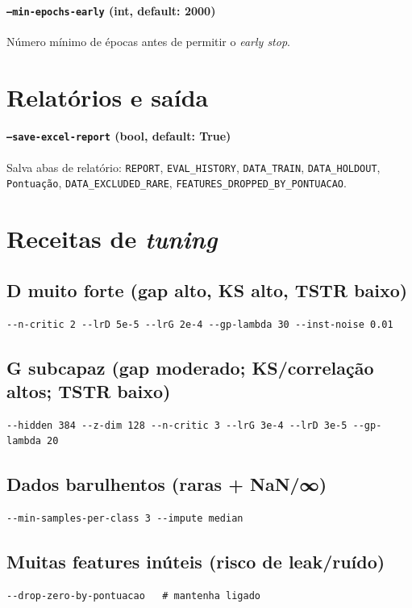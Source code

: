 \documentclass[11pt,a4paper]{article}
\begin{document}
\paragraph{\texttt{--min-epochs-early} (int, default: 2000)} Número mínimo de épocas antes de permitir o \emph{early stop}.

\section{Relatórios e saída}

\paragraph{\texttt{--save-excel-report} (bool, default: True)} Salva abas de relatório:
\texttt{REPORT}, \texttt{EVAL\_HISTORY}, \texttt{DATA\_TRAIN}, \texttt{DATA\_HOLDOUT}, \texttt{Pontuação},
\texttt{DATA\_EXCLUDED\_RARE}, \texttt{FEATURES\_DROPPED\_BY\_PONTUACAO}.

\section{Receitas de \emph{tuning}}

\subsection*{D muito forte (gap alto, KS alto, TSTR baixo)}
\begin{lstlisting}
--n-critic 2 --lrD 5e-5 --lrG 2e-4 --gp-lambda 30 --inst-noise 0.01
\end{lstlisting}

\subsection*{G subcapaz (gap moderado; KS/correlação altos; TSTR baixo)}
\begin{lstlisting}
--hidden 384 --z-dim 128 --n-critic 3 --lrG 3e-4 --lrD 3e-5 --gp-lambda 20
\end{lstlisting}

\subsection*{Dados barulhentos (raras + NaN/∞)}
\begin{lstlisting}
--min-samples-per-class 3 --impute median
\end{lstlisting}

\subsection*{Muitas features inúteis (risco de leak/ruído)}
\begin{lstlisting}
--drop-zero-by-pontuacao   # mantenha ligado
\end{lstlisting}
\end{document}
